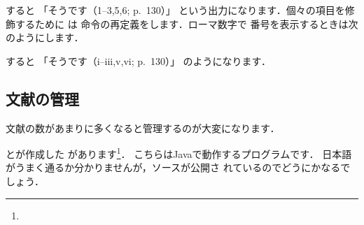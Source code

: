 \begin{intext}
\renewcommand\citemid{; } 
\renewcommand\citeleft{（}
\renewcommand\citeright{）}
\renewcommand\citepunct{,}
\end{intext}

すると
「そうです（1--3,5,6; p.~130）」
という出力になります．個々の項目を修飾するために
は  命令の再定義をします．ローマ数字で
番号を表示するときは次のようにします．

\begin{intext}
\renewcommand\citeform[1]{\romannumeral 0#1}
\end{intext}

すると
「そうです（i--iii,v,vi; p.~130）」
のようになります．

\subsection{文献の管理}
文献の数があまりに多くなると管理するのが大変になります．

とが作成した
があります\footnote{\webJabRef}．
こちらはJavaで動作するプログラムです．
日本語がうまく通るか分かりませんが，ソースが公開さ
れているのでどうにかなるでしょう．

